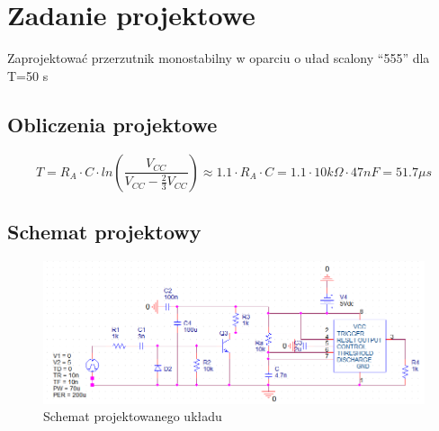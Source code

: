 \documentclass[a4paper,12pt]{article}
\begin{document}
\section{Zadanie projektowe}
Zaprojektować przerzutnik monostabilny w oparciu o uład scalony ``555'' dla T=50 \mu s
\subsection{Obliczenia projektowe}
\begin{equation}
  T=R_A\cdot C\cdot ln\left(\frac{V_{CC}}{V_{CC}-\frac{2}{3}V_{CC}}\right)\approx 1.1\cdot R_A\cdot C=1.1\cdot10k\Omega\cdot47nF = 51.7\mu s
\end{equation}
\subsection {Schemat projektowy}   
\begin{figure}[h]
  \center 
  \includegraphics[width=1.1\textwidth]{schemat}
  \caption{Schemat projektowanego układu}
\end{figure}
\pagebreak
\end{document}
